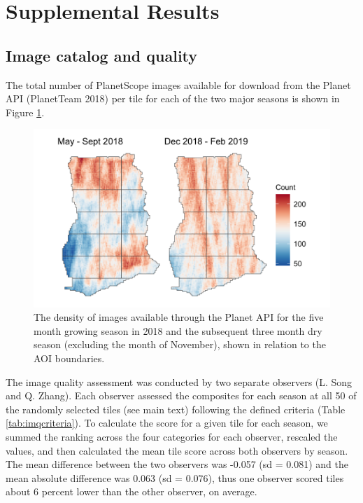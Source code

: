 \documentclass[
  11pt,
  a4paper]{article}
\begin{document}
\hypertarget{supplemental-results}{%
\section{Supplemental Results}\label{supplemental-results}}

\hypertarget{image-catalog-and-quality}{%
\subsection{Image catalog and quality}\label{image-catalog-and-quality}}

The total number of PlanetScope images available for download from the
Planet API (PlanetTeam 2018) per tile for each of the two major seasons
is shown in Figure \ref{fig:imagedensity}.

\begin{figure}[!ht]

{\centering \includegraphics[width=0.9\linewidth,]{figures/si_planet_coverage} 

}

\caption{The density of images available through the Planet API for the five month growing season in 2018 and the subsequent three month dry season (excluding the month of November), shown in relation to the AOI boundaries.}\label{fig:imagedensity}
\end{figure}

The image quality assessment was conducted by two separate observers (L.
Song and Q. Zhang). Each observer assessed the composites for each
season at all 50 of the randomly selected tiles (see main text)
following the defined criteria (Table \ref{tab:imqcriteria}). To
calculate the score for a given tile for each season, we summed the
ranking across the four categories for each observer, rescaled the
values, and then calculated the mean tile score across both observers by
season. The mean difference between the two observers was -0.057 (sd =
0.081) and the mean absolute difference was 0.063 (sd = 0.076), thus one
observer scored tiles about 6 percent lower than the other observer, on
average.
\end{document}
